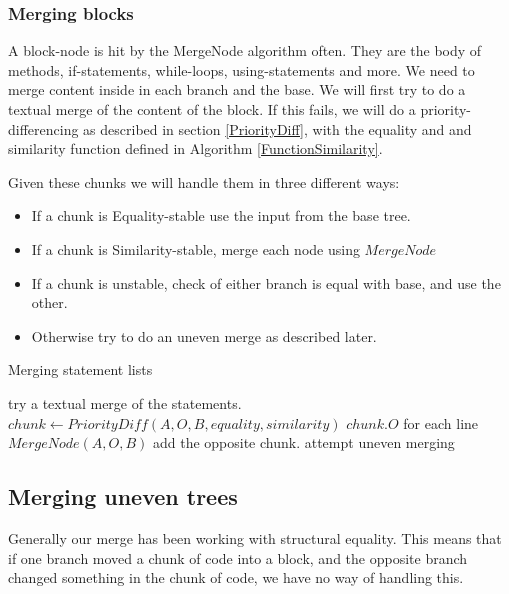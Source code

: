 \documentclass[11pt]{article}
\begin{document}

\subsubsection{Merging blocks}
A block-node is hit by the MergeNode algorithm often. They are the body of methods, if-statements, while-loops, using-statements and more. We need to merge content inside in each branch and the base. We will first try to do a textual merge of the content of the block. If this fails, we will do a priority-differencing as described in section \ref{PriorityDiff}, with the equality and and similarity function defined in Algorithm \ref{FunctionSimilarity}.

Given these chunks we will handle them in three different ways: 

\begin{itemize}
	\item If a chunk is Equality-stable use the input from the base tree.
	\item If a chunk is Similarity-stable, merge each node using $MergeNode$
	\item If a chunk is unstable, check of either branch is equal with base, and use the other.
	\item Otherwise try to do an uneven merge as described later.
\end{itemize}

\begin{algorithm}
  \caption{Merging statement lists}
  \label{MergeStatementList}
\begin{algorithmic}
    \State try  a textual merge of the statements.
        \State $chunk \gets PriorityDiff(A, O, B, equality, similarity)$
                \State \Return $chunk.O$
                \State for each line \Return $MergeNode(A, O, B)$
                \State add the opposite chunk.
            \Else
                \State attempt uneven merging
            \EndIf
        \EndFor
    \EndIf
\EndFunction
\end{algorithmic}
\end{algorithm}

\subsection{Merging uneven trees}
Generally our merge has been working with structural equality. This means that if one branch moved a chunk of code into a block, and the opposite branch changed something in the chunk of code, we have no way of handling this.
\end{document}
